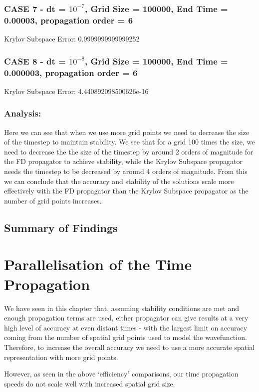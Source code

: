 \subsubsection{CASE 7 - dt = $10^{-7}$, Grid Size = 100000, End Time = 0.00003, propagation order = 6}
Krylov Subspace Error: 0.9999999999999252\newline

\subsubsection{CASE 8 - dt = $10^{-8}$, Grid Size = 100000, End Time = 0.000003, propagation order = 6}
Krylov Subspace Error: 4.440892098500626e-16\newline

\subsubsection{Analysis:}
Here we can see that when we use more grid points we need to decrease the size of the timestep to maintain stability. We see that for a grid 100 times the size, we need to decrease the the size of the timestep by around 2 orders of magnitude for the FD propagator to achieve stability, while the Krylov Subspace propagator needs the timestep to be decreased by around 4 orders of magnitude. From this we can conclude that the accuracy and stability of the solutions scale more effectively with the FD propagator than the Krylov Subspace propagator as the number of grid points increases.

\subsection{Summary of Findings}

\section{Parallelisation of the Time Propagation}
We have seen in this chapter that, assuming stability conditions are met and enough propagation terms are used, either propagator can give results at a very high level of accuracy at even distant times - with the largest limit on accuracy coming from the number of spatial grid points used to model the wavefunction. Therefore, to increase the overall accuracy we need to use a more accurate spatial representation with more grid points. 

However, as seen in the above `efficiency' comparisons, our time propagation speeds do not scale well with increased spatial grid size. 

